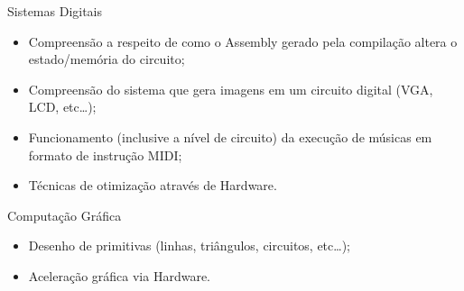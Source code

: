 \documentclass{beamer}
\begin{document}
\begin{darkframes}
    \begin{frame}{Sistemas Digitais}
        \begin{itemize}
            \item Compreensão a respeito de como o Assembly gerado pela
                compilação altera o estado/memória do circuito;
            \item Compreensão do sistema que gera imagens em um circuito
                digital (VGA, LCD, etc\ldots);
            \item Funcionamento (inclusive a nível de circuito) da execução de
                músicas em formato de instrução MIDI\@;
            \item Técnicas de otimização através de Hardware.
        \end{itemize}
    \end{frame}

    \begin{frame}{Computação Gráfica}
        \begin{itemize}
            \item Desenho de primitivas (linhas, triângulos, circuitos, etc\ldots);
            \item Aceleração gráfica via Hardware.
        \end{itemize}
    \end{frame}

\end{darkframes}
\end{document}
